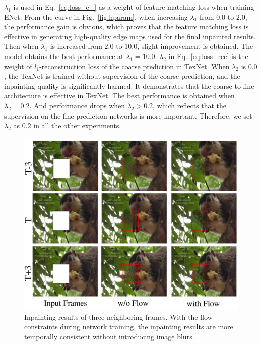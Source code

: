 $\lambda_1$ is used in Eq.~\eqref{eq:loss_e_} as a weight of feature matching loss when training ENet. %
From the curve in Fig.~\ref{fig:hparam}, when increasing $\lambda_1$ from $0.0$ to $2.0$, the performance gain is obvious, which proves that the feature matching loss is effective in
generating high-quality edge maps used for the final inpainted results. 
Then when $\lambda_1$ is increased from $2.0$ to $10.0$, slight improvement is obtained.
The model obtains the best performance at $\lambda_1=10.0$.
%
$\lambda_2$ in Eq.~\eqref{eq:loss_rec} is the weight of $l_1$-reconstruction loss of the coarse prediction in TexNet. 
When $\lambda_2$ is $0.0$, the TexNet is trained without supervision of the coarse prediction, and the inpainting quality is significantly harmed.
It demonstrates that the coarse-to-fine architecture is effective in TexNet. The best performance is obtained when $\lambda_2=0.2$. And performance drops when $\lambda_2>0.2$, which reflects that the supervision on the fine prediction networks is more important.
Therefore, we set $\lambda_2$ as $0.2$ in all the other experiments.


\begin{figure}[t]
	\centering
	\includegraphics[width=0.9\columnwidth]{flow_vis} %
	\caption{Inpainting results of three neighboring frames. With the flow constraints during network training, the inpainting results are more temporally consistent without introducing image blurs. }
	\label{flow_vis}
\end{figure}



